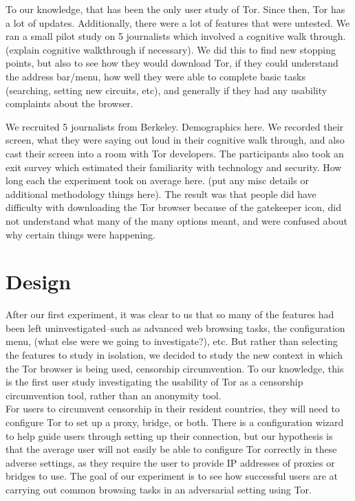 \documentclass{sig-alternate-hotpets15}
\begin{document}
To our knowledge, that has been the only user study of Tor. Since then, Tor has a lot of updates. Additionally, there were a lot of features that were untested. We ran a small pilot study on 5 journalists which involved a cognitive walk through.(explain cognitive walkthrough if necessary). We did this to find new stopping points, but also to see how they would download Tor, if they could understand the address bar/menu, how well they were able to complete basic tasks (searching, setting new circuits, etc), and generally if they had any usability complaints about the browser. 

We recruited 5 journalists from Berkeley. Demographics here. We recorded their screen, what they were saying out loud in their cognitive walk through, and also cast their screen into a room with Tor developers. The participants also took an exit survey which estimated their familiarity with technology and security. How long each the experiment took on average here. (put any misc details or additional methodology things here). The result was that people did have difficulty with downloading the Tor browser because of the gatekeeper icon, did not understand what many of the many options meant, and were confused about why certain things were happening. 

\section{Design}
After our first experiment, it was clear to us that so many of the features had been left uninvestigated--such as advanced web browsing tasks, the configuration menu, (what else were we going to investigate?), etc. But rather than selecting the features to study in isolation, we decided to study the new context in which the Tor browser is being used, censorship circumvention. To our knowledge, this is the first user study investigating the usability of Tor as a censorship circumvention tool, rather than an anonymity tool. \\

For users to circumvent censorship in their resident countries, they will need to configure Tor to set up a proxy, bridge, or both. There is a configuration wizard to help guide users through setting up their connection, but our hypothesis is that the average user will not easily be able to configure Tor correctly in these adverse settings, as they require the user to provide IP addresses of proxies or bridges to use. The goal of our experiment is to see how successful users are at carrying out common browsing tasks in an adversarial setting using Tor. 
\end{document}
